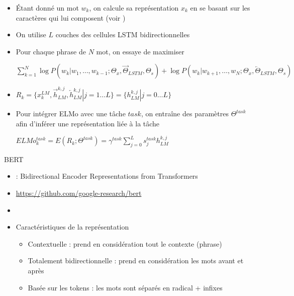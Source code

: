 \documentclass{KodeBook}
\begin{document}
\begin{itemize}
	\item Étant donné un mot $w_k$, on calcule sa représentation $x_k$ en se basant sur les caractères qui lui composent (voir \cite{2015-kim-al})
	\item On utilise $L$ couches des cellules LSTM bidirectionnelles 
	\item Pour chaque  phrase de $N$ mot, on essaye de maximiser\\ 
	\begin{center}
		$\sum_{k=1}^{N} 
		\log P(w_k | w_1,\ldots,w_{k-1}; \Theta_x, \overrightarrow{\Theta}_{LSTM}, \Theta_s)
		+
		\log P(w_k | w_{k+1},\ldots,w_{N}; \Theta_x, \overleftarrow{\Theta}_{LSTM}, \Theta_s)
		$
	\end{center}
	
	\item $R_k = \{x_k^{LM}, \overrightarrow{h}_{LM}^{k, j}, \overleftarrow{h}_{LM}^{k, j} | j= 1 \ldots L \}
	= \{h_{LM}^{k, j} | j= 0 \ldots L \}
	$
	
	\item Pour intégrer ELMo avec une tâche  $task$, on entraîne des paramètres $\Theta^{task}$ afin d'inférer une représentation liée à la tâche \\
	\begin{center}
		$ELMo_k^{task} = E(R_k; \Theta^{task}) = \gamma^{task} \sum_{j=0}^{L} s_j^{task} h_{LM}^{k, j}$
	\end{center}
\end{itemize}

BERT
\begin{minipage}{.68\textwidth}
	\begin{itemize}
		\item {} : Bidirectional Encoder Representations from Transformers
		\item \url{https://github.com/google-research/bert}
		\item \cite{2019-devlin-al}
		\item Caractéristiques de la représentation
		\begin{itemize}
			\item Contextuelle :  prend en considération tout le contexte (phrase)
			\item Totalement bidirectionnelle : prend en considération les mots avant et après 
			\item Basée sur les tokens : les mots sont séparés en radical + infixes
		\end{itemize}
	\end{itemize}
\end{minipage}
\begin{minipage}{.3\textwidth}
	\vspace{.5cm}
\end{minipage}
\end{document}
